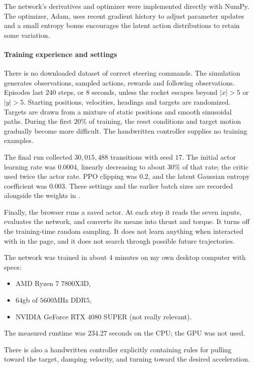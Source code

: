 \documentclass[12pt, letterpaper]{article}
\begin{document}
The network's derivatives and 
optimizer were implemented directly with 
NumPy.
The optimizer, Adam, uses recent gradient history to 
adjust parameter updates and a small 
entropy bonus encourages the latent action 
distributions to retain some variation. 

\paragraph{Training experience and settings}
There is no downloaded dataset of correct steering commands.
The simulation generates observations, sampled actions, rewards
and following observations. Episodes last $240$ steps, or $8$
seconds, unless the rocket escapes beyond $|x|>5$ or $|y|>5$.
Starting positions, velocities, headings and targets are randomized.
Targets are drawn from a mixture of static positions and smooth
sinusoidal paths. During the first $20\%$ of training, the reset
conditions and target motion gradually become more difficult.
The handwritten controller supplies no training examples.

The final run collected $30,015,488$ transitions with seed $17$.
The initial actor learning rate was $0.0004$, linearly decreasing
to about $30\%$ of that rate; the critic used twice the actor rate.
PPO clipping was $0.2$, and the latent Gaussian entropy coefficient
was $0.003$. These settings and the earlier batch sizes are recorded
alongside the weights in .

Finally, the browser runs a saved actor. At 
each step it reads the seven inputs, evaluates 
the network, and converts its means into thrust and 
torque. It turns off the training-time random 
sampling. It does not learn anything when 
interacted with in the page, and it does 
not search through possible future trajectories. 

The network was trained in about $4$ minutes on my 
own desktop computer with specs:
\begin{itemize}
    \item AMD Ryzen $7$ $7800$X$3$D, 
    \item $64$gb of $5600$MHz DDR$5$, 
    \item NVIDIA GeForce RTX $4080$ SUPER (not really relevant).
\end{itemize}
The measured runtime was $234.27$ seconds on the CPU;
the GPU was not used.

There is also a handwritten controller explicitly 
containing rules for pulling toward the target, 
damping velocity, and turning toward the 
desired acceleration. 
\end{document}
